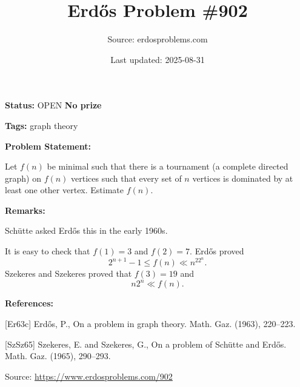 \documentclass{article}
\title{Erd\H{o}s Problem \#902}
\date{Last updated: 2025-08-31}
\author{Source: erdosproblems.com}
\begin{document}
\maketitle

\noindent\textbf{Status:} OPEN \quad \textbf{No prize}

\noindent\textbf{Tags:} graph theory

\medskip
\noindent\textbf{Problem Statement:}

Let $f(n)$ be minimal such that there is a tournament (a complete directed graph) on $f(n)$ vertices such that every set of $n$ vertices is dominated by at least one other vertex. Estimate $f(n)$.

\bigskip
\noindent\textbf{Remarks:}

Sch\"{u}tte asked Erd\H{o}s this in the early 1960s.

It is easy to check that $f(1)=3$ and $f(2)=7$. Erd\H{o}s \cite{Er63c} proved\[2^{n+1}-1 \leq f(n) \ll n^22^n.\]Szekeres and Szekeres \cite{SzSz65} proved that $f(3)=19$ and\[n2^n \ll f(n).\]

\bigskip
\noindent\textbf{References:}

[Er63c] Erd\H{o}s, P., On a problem in graph theory. Math. Gaz. (1963), 220--223.
 
 [SzSz65] Szekeres, E. and Szekeres, G., On a problem of Sch\"{u}tte and {E}rd\H{o}s. Math. Gaz. (1965), 290--293.

\bigskip
\noindent\small{Source: \url{https://www.erdosproblems.com/902}}
\end{document}
